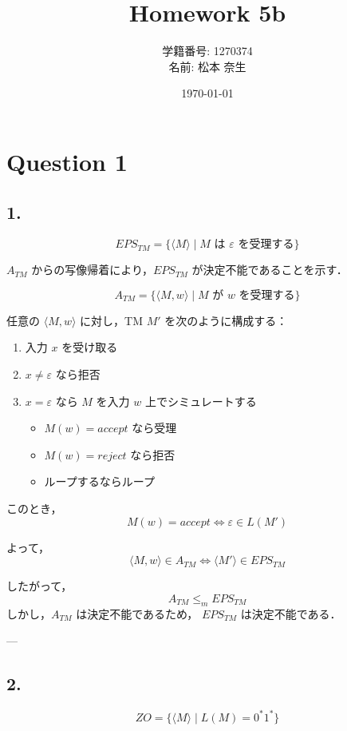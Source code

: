 \documentclass[a4paper,11pt]{ltjsarticle}
\title{Homework 5b}
\author{学籍番号: 1270374 \\ 名前: 松本 奈生}
\date{\today}
\begin{document}
\maketitle

\section*{Question 1}

\subsection*{1.}
\[
EPS_{TM} = \{ \langle M \rangle \mid M \text{ は } \varepsilon \text{ を受理する} \}
\]

$A_{TM}$ からの写像帰着により，$EPS_{TM}$ が決定不能であることを示す．

\[
A_{TM} = \{ \langle M, w \rangle \mid M \text{ が } w \text{ を受理する} \}
\]

任意の $\langle M, w \rangle$ に対し，TM $M'$ を次のように構成する：

\begin{enumerate}
    \item 入力 $x$ を受け取る
    \item $x \neq \varepsilon$ なら拒否
    \item $x = \varepsilon$ なら $M$ を入力 $w$ 上でシミュレートする
    \begin{itemize}
        \item $M(w)=accept$ なら受理
        \item $M(w)=reject$ なら拒否
        \item ループするならループ
    \end{itemize}
\end{enumerate}

このとき，
\[
M(w)=accept \iff \varepsilon \in L(M')
\]

よって，
\[
\langle M,w\rangle \in A_{TM} \iff \langle M' \rangle \in EPS_{TM}
\]

したがって，
\[
A_{TM} \leq_m EPS_{TM}
\]
しかし，$A_{TM}$ は決定不能であるため，
$EPS_{TM}$ は決定不能である．

---

\subsection*{2.}
\[
ZO = \{ \langle M \rangle \mid L(M)=0^*1^* \}
\]
\end{document}
